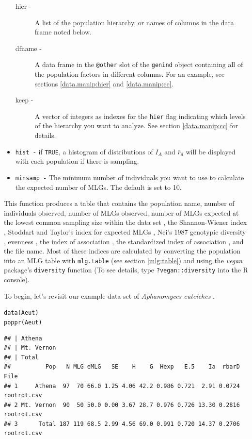 \documentclass[letterpaper]{article}\usepackage[]{graphicx}\usepackage[]{color}
\makeatletter
\newcommand{\hlstd}[1]{\textcolor[rgb]{0,0,0}{#1}}%
\newcommand{\hlkwd}[1]{\textcolor[rgb]{0,0.267,0.4}{#1}}%
\newenvironment{kframe}{%
 \def\at@end@of@kframe{}%
 \ifinner\ifhmode%
  \def\at@end@of@kframe{\end{minipage}}%
  \begin{minipage}{\columnwidth}%
 \fi\fi%
 \def\FrameCommand##1{\hskip\@totalleftmargin \hskip-\fboxsep
 \colorbox{shadecolor}{##1}\hskip-\fboxsep
     \hskip-\linewidth \hskip-\@totalleftmargin \hskip\columnwidth}%
 \MakeFramed {\advance\hsize-\width
   \@totalleftmargin\z@ \linewidth\hsize
   \@setminipage}}%
 {\par\unskip\endMakeFramed%
 \at@end@of@kframe}
\newenvironment{knitrout}{}{} %
\makeatother
\begin{document}
\begin{itemize}
\begin{description}
    \item[hier -] A list of the population hierarchy, or names of columns in the data frame noted below.
    \item[dfname -] A data frame in the \texttt{@other} slot of the \texttt{genind} object containing all of the population factors in different columns. For an example, see sections \ref{data.manip:hier} and \ref{data.manip:cc}.
    \item[keep -] A vector of integers as indexes for the \texttt{hier} flag indicating which levels of the hierarchy you want to analyze. See section \ref{data.manip:cc} for details. 
  \end{description}
  \item \texttt{hist -} if \texttt{TRUE}, a histogram of distributions of $I_A$ and $\bar r_d$ will be displayed with each population if there is sampling.
  \item \texttt{minsamp -} The minimum number of individuals you want to use to calculate the expected number of MLGs. The default is set to 10.
\end{itemize}

This function produces a table that contains the population name, number of individuals observed, number of MLGs observed, number of MLGs expected at the lowest common sampling size within the data set \cite{Hurlbert:1971} \cite{Heck:1975}, the Shannon-Wiener index \cite{Shannon:1948}, Stoddart and Taylor's index for expected MLGs \cite{Stoddart:1988}, Nei's 1987 genotypic diversity \cite{Nei:1978}, evenness \cite{Pielou:1975}\cite{Ludwig:1988}\cite{Grunwald:2003}, the index of association \cite{Brown:1980}\cite{Smith:1993}, the standardized index of association \cite{Agapow:2001}, and the file name. Most of these indices are calculated by converting the population into an MLG table with \texttt{mlg.table} (see section \ref{mlg:table}) and using the \textit{vegan} package's \texttt{diversity} function (To see details, type \texttt{?vegan::diversity} into the R console).

To begin, let's revisit our example data set of \textit{Aphanomyces euteiches} \cite{Grunwald:2006}.
\begin{knitrout}\footnotesize
{}\color{fgcolor}\begin{kframe}
\begin{alltt}
\hlkwd{data}\hlstd{(Aeut)}
\hlkwd{poppr}\hlstd{(Aeut)}
\end{alltt}
\begin{verbatim}
## | Athena 
## | Mt. Vernon 
## | Total
##          Pop   N MLG eMLG   SE    H    G  Hexp   E.5    Ia  rbarD        File
## 1     Athena  97  70 66.0 1.25 4.06 42.2 0.986 0.721  2.91 0.0724 rootrot.csv
## 2 Mt. Vernon  90  50 50.0 0.00 3.67 28.7 0.976 0.726 13.30 0.2816 rootrot.csv
## 3      Total 187 119 68.5 2.99 4.56 69.0 0.991 0.720 14.37 0.2706 rootrot.csv
\end{verbatim}
\end{kframe}
\end{knitrout}
\end{document}
